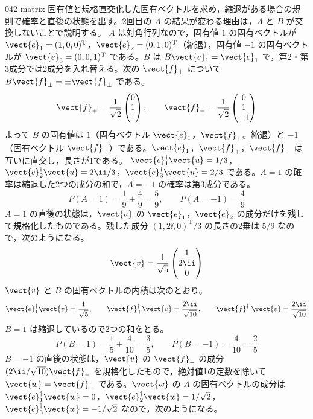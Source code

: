 \documentclass[uplatex,dvipdfmx,a4paper,11pt]{jsarticle}
\begin{document}
\begin{kaisetsu}{042-matrix}
\houshin 固有値と規格直交化した固有ベクトルを求め，縮退がある場合の規則で確率と直後の状態を出す。2回目の $A$ の結果が変わる理由は，$A$ と $B$ が交換しないことで説明する。
\keisan
{} $A$ は対角行列なので，固有値 $1$ の固有ベクトルが $\vect{e}_{1}=(1,0,0)^{\mathrm{T}}$，$\vect{e}_{2}=(0,1,0)^{\mathrm{T}}$（縮退），固有値 $-1$ の固有ベクトルが $\vect{e}_{3}=(0,0,1)^{\mathrm{T}}$ である。$B$ は $B\vect{e}_{1}=\vect{e}_{1}$ で，第2・第3成分では2成分を入れ替える。次の $\vect{f}_{\pm}$ について $B\vect{f}_{\pm}=\pm\vect{f}_{\pm}$ である。
\[ \vect{f}_{+}=\frac{1}{\sqrt{2}}\begin{pmatrix}0\\1\\1\end{pmatrix},\qquad \vect{f}_{-}=\frac{1}{\sqrt{2}}\begin{pmatrix}0\\1\\-1\end{pmatrix} \]
よって $B$ の固有値は $1$（固有ベクトル $\vect{e}_{1}$，$\vect{f}_{+}$。縮退）と $-1$（固有ベクトル $\vect{f}_{-}$）である。$\vect{e}_{1}$，$\vect{f}_{+}$，$\vect{f}_{-}$ は互いに直交し，長さが1である。
 $\vect{e}_{1}^{\dagger}\vect{u}=1/3$，$\vect{e}_{2}^{\dagger}\vect{u}=2\ii/3$，$\vect{e}_{3}^{\dagger}\vect{u}=2/3$ である。$A=1$ の確率は縮退した2つの成分の和で，$A=-1$ の確率は第3成分である。
\[ P(A=1)=\frac{1}{9}+\frac{4}{9}=\frac{5}{9},\qquad P(A=-1)=\frac{4}{9} \]
$A=1$ の直後の状態は，$\vect{u}$ の $\vect{e}_{1}$，$\vect{e}_{2}$ の成分だけを残して規格化したものである。残した成分 $(1,2\ii,0)^{\mathrm{T}}/3$ の長さの2乗は $5/9$ なので，次のようになる。
\[ \vect{v}=\frac{1}{\sqrt{5}}\begin{pmatrix}1\\2\ii\\0\end{pmatrix} \]
 $\vect{v}$ と $B$ の固有ベクトルの内積は次のとおり。
\[ \vect{e}_{1}^{\dagger}\vect{v}=\frac{1}{\sqrt{5}},\qquad \vect{f}_{+}^{\dagger}\vect{v}=\frac{2\ii}{\sqrt{10}},\qquad \vect{f}_{-}^{\dagger}\vect{v}=\frac{2\ii}{\sqrt{10}} \]
$B=1$ は縮退しているので2つの和をとる。
\[ P(B=1)=\frac{1}{5}+\frac{4}{10}=\frac{3}{5},\qquad P(B=-1)=\frac{4}{10}=\frac{2}{5} \]
$B=-1$ の直後の状態は，$\vect{v}$ の $\vect{f}_{-}$ の成分 $(2\ii/\sqrt{10})\vect{f}_{-}$ を規格化したもので，絶対値1の定数を除いて $\vect{w}=\vect{f}_{-}$ である。$\vect{w}$ の $A$ の固有ベクトルの成分は $\vect{e}_{1}^{\dagger}\vect{w}=0$，$\vect{e}_{2}^{\dagger}\vect{w}=1/\sqrt{2}$，$\vect{e}_{3}^{\dagger}\vect{w}=-1/\sqrt{2}$ なので，次のようになる。

\end{kaisetsu}
\end{document}
